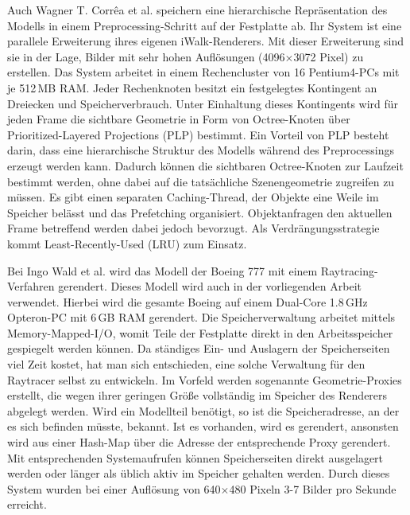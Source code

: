 Auch Wagner T. Corr\^{e}a et al. speichern eine hierarchische Repräsentation des Modells in einem Preprocessing-Schritt auf der Festplatte ab. Ihr System ist eine parallele Erweiterung ihres eigenen iWalk-Renderers. Mit dieser Erweiterung sind sie in der Lage, Bilder mit sehr hohen Auflösungen (4096$\times$3072 Pixel) zu erstellen. Das System arbeitet in einem Rechencluster von 16 Pentium4-PCs mit je 512\,MB RAM. Jeder Rechenknoten besitzt ein festgelegtes Kontingent an Dreiecken und Speicherverbrauch. Unter Einhaltung dieses Kontingents wird für jeden Frame die sichtbare Geometrie in Form von Octree-Knoten über Prioritized-Layered Projections (PLP) bestimmt. Ein Vorteil von PLP besteht darin, dass eine hierarchische Struktur des Modells während des Preprocessings erzeugt werden kann. Dadurch können die sichtbaren Octree-Knoten zur Laufzeit bestimmt werden, ohne dabei auf die tatsächliche Szenengeometrie zugreifen zu müssen. Es gibt einen separaten Caching-Thread, der Objekte eine Weile im Speicher belässt und das Prefetching organisiert. Objektanfragen den aktuellen Frame betreffend werden dabei jedoch bevorzugt. Als Verdrängungsstrategie kommt Least-Recently-Used (LRU) zum Einsatz.


Bei Ingo Wald et al. wird das Modell der Boeing 777 mit einem Raytracing-Verfahren gerendert. Dieses Modell wird auch in der vorliegenden Arbeit verwendet. Hierbei wird die gesamte Boeing auf einem Dual-Core 1.8\,GHz Opteron-PC mit 6\,GB RAM gerendert. Die Speicherverwaltung arbeitet mittels Memory-Mapped-I/O, womit Teile der Festplatte direkt in den Arbeitsspeicher gespiegelt werden können. Da ständiges Ein- und Auslagern der Speicherseiten viel Zeit kostet, hat man sich entschieden, eine solche Verwaltung für den Raytracer selbst zu entwickeln. Im Vorfeld werden sogenannte Geometrie-Proxies erstellt, die wegen ihrer geringen Größe vollständig im Speicher des Renderers abgelegt werden. Wird ein Modellteil benötigt, so ist die Speicheradresse, an der es sich befinden müsste, bekannt. Ist es vorhanden, wird es gerendert, ansonsten wird aus einer Hash-Map über die Adresse der entsprechende Proxy gerendert. Mit entsprechenden Systemaufrufen können Speicherseiten direkt ausgelagert werden oder länger als üblich aktiv im Speicher gehalten werden. Durch dieses System wurden bei einer Auflösung von 640$\times$480 Pixeln 3-7 Bilder pro Sekunde erreicht.


%
